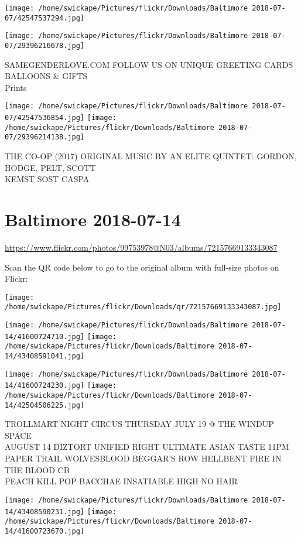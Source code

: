 \documentclass[10pt,letterpaper]{article}
\begin{document}
\texttt{[image: /home/swickape/Pictures/flickr/Downloads/Baltimore 2018-07-07/42547537294.jpg]}

\vspace{0.25in}
\texttt{[image: /home/swickape/Pictures/flickr/Downloads/Baltimore 2018-07-07/29396216678.jpg]}

SAMEGENDERLOVE.COM FOLLOW US ON UNIQUE GREETING CARDS BALLOONS \& GIFTS\\
Prints
\pagebreak

\texttt{[image: /home/swickape/Pictures/flickr/Downloads/Baltimore 2018-07-07/42547536854.jpg]}
\texttt{[image: /home/swickape/Pictures/flickr/Downloads/Baltimore 2018-07-07/29396214138.jpg]}

THE CO{-}OP (2017) ORIGINAL MUSIC BY AN ELITE QUINTET: GORDON, HODGE, PELT, SCOTT\\
KEMST SOST CASPA
\pagebreak

\section*{Baltimore 2018-07-14}

\url{https://www.flickr.com/photos/99753978@N03/albums/72157669133343087}

Scan the QR code below to go to the original album with full-size photos on Flickr:

\texttt{[image: /home/swickape/Pictures/flickr/Downloads/qr/72157669133343087.jpg]}
\pagebreak

\texttt{[image: /home/swickape/Pictures/flickr/Downloads/Baltimore 2018-07-14/41600724710.jpg]}
\texttt{[image: /home/swickape/Pictures/flickr/Downloads/Baltimore 2018-07-14/43408591041.jpg]}

\texttt{[image: /home/swickape/Pictures/flickr/Downloads/Baltimore 2018-07-14/41600724230.jpg]}
\texttt{[image: /home/swickape/Pictures/flickr/Downloads/Baltimore 2018-07-14/42504506225.jpg]}

TROLLMART NIGHT CIRCUS THURSDAY JULY 19 @ THE WINDUP SPACE\\
AUGUST 14 DIZTORT UNIFIED RIGHT ULTIMATE ASIAN TASTE 11PM\\
PAPER TRAIL WOLVESBLOOD BEGGAR'S ROW HELLBENT FIRE IN THE BLOOD CB\\
PEACH KILL POP BACCHAE INSATIABLE HIGH NO HAIR
\pagebreak

\texttt{[image: /home/swickape/Pictures/flickr/Downloads/Baltimore 2018-07-14/43408590231.jpg]}
\texttt{[image: /home/swickape/Pictures/flickr/Downloads/Baltimore 2018-07-14/41600723670.jpg]}
\end{document}
